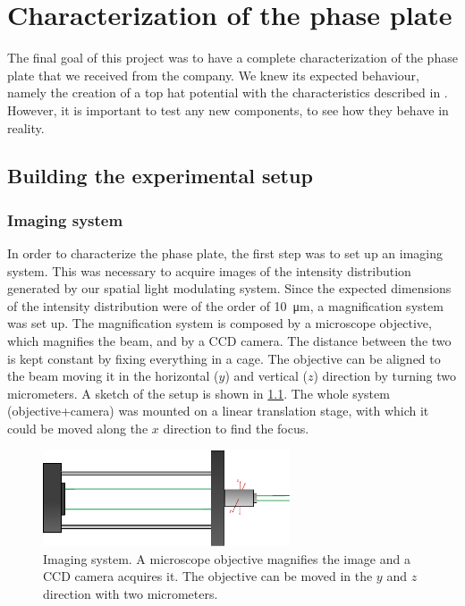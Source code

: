 \chapter{Characterization of the phase plate}
The final goal of this project was to have a complete characterization of the phase plate that we received from the company. We knew its expected behaviour, namely the creation of a top hat potential with the characteristics described in . However, it is important to test any new components, to see how they behave in reality.

\section{Building the experimental setup}
\subsection{Imaging system}
In order to characterize the phase plate, the first step was to set up an imaging system. This was necessary to acquire images of the intensity distribution generated by our spatial light modulating system. Since the expected dimensions of the intensity distribution were of the order of \SI{10}{\micro\meter}, a magnification system was set up. The magnification system is composed by a microscope objective, which magnifies the beam, and by a CCD camera. The distance between the two is kept constant by fixing everything in a cage. The objective can be aligned to the beam moving it in the horizontal ($y$) and vertical ($z$) direction by turning two micrometers. A sketch of the setup is shown in \cref{fig:imaging}. The whole system (objective+camera) was mounted on a linear translation stage, with which it could be moved along the $x$ direction to find the focus.

\begin{figure}
    \centering
    \includegraphics[width=0.65\textwidth]{chapters/chapter_3/figures/imaging}
    \caption{Imaging system. A microscope objective magnifies the image and a CCD camera acquires it. The objective can be moved in the $y$ and $z$ direction with two micrometers.}
    \label{fig:imaging}
\end{figure}


